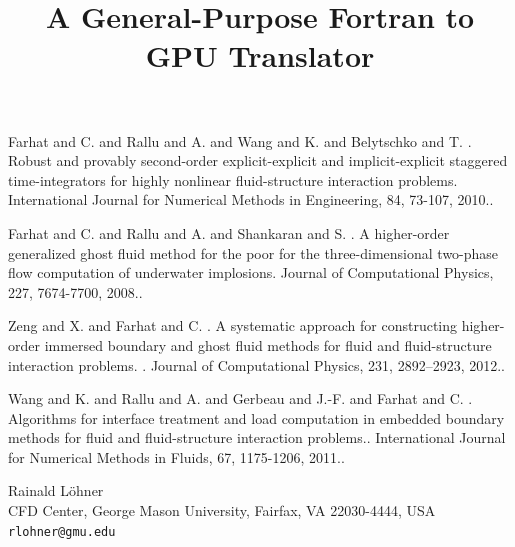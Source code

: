 \documentclass[article, A4, 11pt]{llncs}%
\begin{document}

\begin{thebibliography}{10}
{\sc Farhat  and C.  and Rallu  and A.  and Wang  and K. and Belytschko and T. }. {Robust and provably second-order explicit-explicit and implicit-explicit staggered time-integrators for highly nonlinear fluid-structure interaction problems}. International Journal for Numerical Methods in Engineering, 84, 73-107, 2010..

{\sc Farhat  and C.  and Rallu  and A. and Shankaran and S. }. {A higher-order generalized ghost fluid method for the poor for the three-dimensional two-phase flow computation of underwater implosions}. Journal of Computational Physics, 227, 7674-7700, 2008..

{\sc Zeng  and X. and Farhat and C. }. {A systematic approach for constructing higher-order immersed boundary and ghost fluid methods for fluid and fluid-structure interaction problems. }. Journal of Computational Physics, 231, 2892–2923, 2012..

{\sc Wang  and K.  and Rallu  and A.  and Gerbeau  and J.-F. and Farhat and C. }. {Algorithms for interface treatment and load computation in embedded boundary methods for fluid and fluid-structure interaction problems.}. International Journal for Numerical Methods in Fluids, 67, 1175-1206, 2011..
\end{thebibliography} %

\title{A General-Purpose Fortran to GPU Translator}
 \author{} \institute{}
\maketitle
\begin{center}
{\large Rainald L\"ohner}\\
CFD Center, George Mason University, Fairfax, VA 22030-4444, USA\\
{\tt rlohner@gmu.edu}
\end{center}
\end{document}
